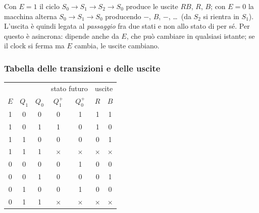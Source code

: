 \begin{center}
\end{center}

\noindent Con $E=1$ il ciclo $S_0\to S_1\to S_2\to S_0$ produce le uscite $RB$, $R$, $B$;
con $E=0$ la macchina alterna $S_0 \to S_1 \to S_0$ producendo $-$, $B$, $-$, \ldots\ (da
$S_2$ si rientra in $S_1$). L'uscita è quindi legata al \emph{passaggio} fra due stati e non
allo stato di per sé. Per questo è asincrona: dipende anche da $E$, che può cambiare in
qualsiasi istante; se il clock si ferma ma $E$ cambia, le uscite cambiano.

\subsubsection*{Tabella delle transizioni e delle uscite}

\begin{center}
\begin{tabular}{c|cc|cc|cc}
\toprule
 & & & \multicolumn{2}{c|}{stato futuro} & \multicolumn{2}{c}{uscite} \\
$E$ & $Q_1$ & $Q_0$ & $Q_1^+$ & $Q_0^+$ & $R$ & $B$ \\
\midrule
1 & 0 & 0 & 0 & 1 & 1 & 1 \\
1 & 0 & 1 & 1 & 0 & 1 & 0 \\
1 & 1 & 0 & 0 & 0 & 0 & 1 \\
1 & 1 & 1 & $\times$ & $\times$ & $\times$ & $\times$ \\
\midrule
0 & 0 & 0 & 0 & 1 & 0 & 0 \\
0 & 0 & 1 & 0 & 0 & 0 & 1 \\
0 & 1 & 0 & 0 & 1 & 0 & 0 \\
0 & 1 & 1 & $\times$ & $\times$ & $\times$ & $\times$ \\
\bottomrule
\end{tabular}
\end{center}

